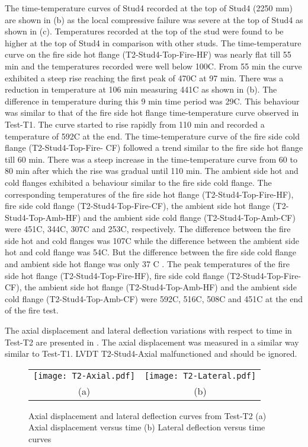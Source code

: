 The time-temperature curves of Stud4 recorded at the top of Stud4 (2250 mm) are shown in  (b) as the local compressive failure was severe at the top of Stud4 as shown in  (c). Temperatures recorded at the top of the stud were found to be higher at the top of Stud4 in comparison with other studs. The time-temperature curve on the fire side hot flange (T2-Stud4-Top-Fire-HF) was nearly flat till 55 min and the temperatures recorded were well below 100\degree C. From 55 min the curve exhibited a steep rise reaching the first peak of 470\degree C at 97 min. There was a reduction in temperature at 106 min measuring 441\degree C as shown in  (b). The difference in temperature during this 9 min time period was 29\degree C. This behaviour was similar to that of the fire side hot flange time-temperature curve observed in Test-T1. The curve started to rise rapidly from 110 min and recorded a temperature of 592\degree C at the end. The time-temperature curve of the fire side cold flange (T2-Stud4-Top-Fire- CF) followed a trend similar to the fire side hot flange till 60 min. There was a steep increase in the time-temperature curve from 60 to 80 min after which the rise was gradual until 110 min. The ambient side hot and cold flanges exhibited a behaviour similar to the fire side cold flange. The corresponding temperatures of the fire side hot flange (T2-Stud4-Top-Fire-HF), fire side cold flange (T2-Stud4-Top-Fire-CF), the ambient side hot flange (T2-Stud4-Top-Amb-HF) and the ambient side cold flange (T2-Stud4-Top-Amb-CF) were 451\degree C, 344\degree C, 307\degree C and 253\degree C, respectively. The difference between the fire side hot and cold flanges was 107\degree C while the difference between the ambient side hot and cold flange was 54\degree C. But the difference between the fire side cold flange and ambient side hot flange was only 37 \degree C . The peak temperatures of the fire side hot flange (T2-Stud4-Top-Fire-HF), fire side cold flange (T2-Stud4-Top-Fire-CF), the ambient side hot flange (T2-Stud4-Top-Amb-HF) and the ambient side cold flange (T2-Stud4-Top-Amb-CF) were 592\degree C, 516\degree C, 508\degree C and 451\degree C at the end of the fire test.

The axial displacement and lateral deflection variations with respect to time in Test-T2 are presented in . The axial displacement was measured in a similar way similar to Test-T1. LVDT T2-Stud4-Axial malfunctioned and should be ignored.
	\begin{figure}[!htbp]
	\centering
		\begin{tabular}{cc}
			\texttt{[image: T2-Axial.pdf]} & \texttt{[image: T2-Lateral.pdf]} \\
			(a) & (b) \\
		\end{tabular} 
		\caption{Axial displacement and lateral deflection curves from Test-T2 (a) Axial displacement versus time (b) Lateral deflection versus time curves}
		\label{fig:T2-Axial-Lateral}
\end{figure}


